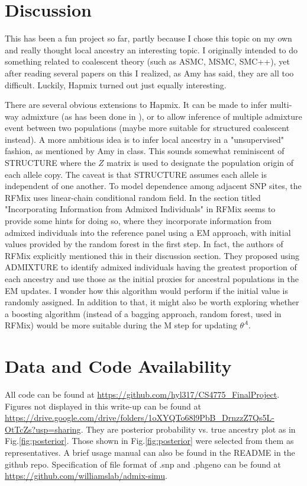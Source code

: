 \documentclass{article}
\begin{document}
\section{Discussion}
    This has been a fun project so far, partly because I chose this topic on my own and really thought local ancestry an interesting topic. I originally intended to do something related to coalescent theory (such as ASMC\cite{ASMC}, MSMC\cite{MSMC}, SMC++\cite{SMC++}), yet after reading several papers on this I realized, as Amy has said, they are all too difficult. Luckily, Hapmix turned out just equally interesting.
    
    There are several obvious extensions to Hapmix. It can be made to infer multi-way admixture (as has been done in \cite{1000Genome}), or to allow inference of multiple admixture event between two populations (maybe more suitable for structured coalescent instead). A more ambitious idea is to infer local ancestry in a "unsupervised" fashion, as mentioned by Amy in class. This sounds somewhat reminiscent of STRUCTURE\cite{STRUCTURE} where the $Z$ matrix is used to designate the population origin of each allele copy. The caveat is that STRUCTURE assumes each allele is independent of one another. To model dependence among adjacent SNP sites, the RFMix\cite{RFMix} uses linear-chain conditional random field. In the section titled "Incorporating Information from Admixed Individuals" in RFMix\cite{RFMix} seems to provide some hints for doing so, where they incorporate information from admixed individuals into the reference panel using a EM approach, with initial values provided by the random forest in the first step. In fact, the authors of RFMix explicitly mentioned this in their discussion section. They proposed using ADMIXTURE\cite{ADMIXTURE} to identify admixed individuals having the greatest proportion of each ancestry and use those as the initial proxies for ancestral populations in the EM updates. I wonder how this algorithm would perform if the initial value is randomly assigned. In addition to that, it might also be worth exploring whether a boosting algorithm (instead of a bagging approach, random forest, used in RFMix) would be more suitable during the M step for updating $\theta^A$. 

    
\section{Data and Code Availability}

All code can be found at \url{https://github.com/hyl317/CS4775_FinalProject}. Figures not displayed in this write-up can be found at \url{https://drive.google.com/drive/folders/1oXYQTo68l9PbB_DrnzzZ7Qs5L-OtTcZs?usp=sharing}. They are posterior probability vs. true ancestry plot as in Fig.\ref{fig:posterior}. Those shown in Fig.\ref{fig:posterior} were selected from them as representatives. A brief usage manual can also be found in the README in the github repo. Specification of file format of .snp and .phgeno can be found at \url{https://github.com/williamslab/admix-simu}.
\end{document}
